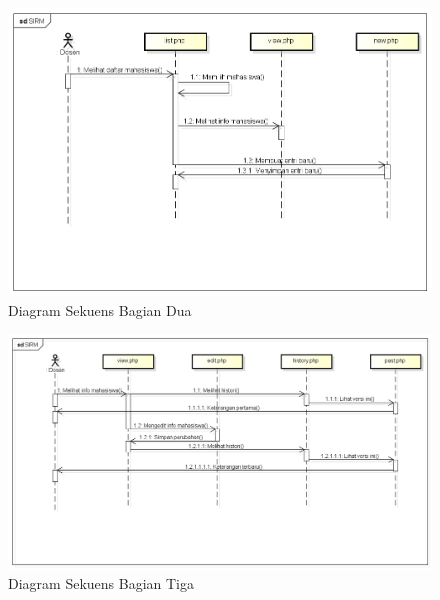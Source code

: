 \begin{figure}[H]
\centering
\includegraphics[scale=0.5]{Gambar/sekuenslist.png}
\caption[Diagram Sekuens Bagian Dua]{Diagram Sekuens Bagian Dua} 
\label{fig:ds2}
\end{figure}

\begin{figure}[H]
\centering
\includegraphics[scale=0.5]{Gambar/sekuensview.png}
\caption[Diagram Sekuens Bagian Tiga]{Diagram Sekuens Bagian Tiga} 
\label{fig:ds3}
\end{figure}